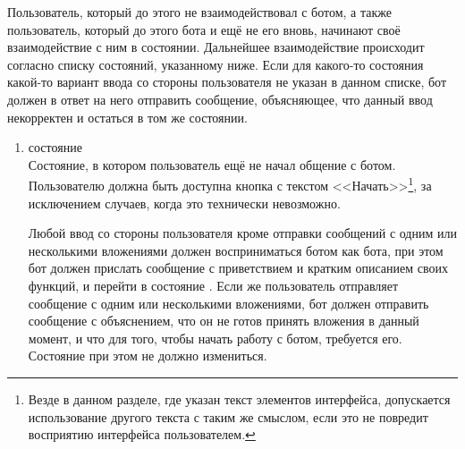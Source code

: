         Пользователь, который до этого не взаимодействовал с ботом, а также пользователь, который
        до этого  бота и ещё не  его вновь, начинают
        своё взаимодействие с ним в \hyperref[itm:req:ui:states:init]{} состоянии.
        Дальнейшее взаимодействие происходит согласно списку состояний, указанному ниже.
        Если для какого-то состояния какой-то вариант ввода со стороны пользователя не указан в данном
        списке, бот должен в ответ на него отправить сообщение, объясняющее, что данный
        ввод некорректен и остаться в том же состоянии.
        \begin{enumerate}
            \item \label{itm:req:ui:states:init}
                 состояние \\
                Состояние, в котором пользователь ещё не начал общение с ботом.
                Пользователю должна быть доступна кнопка с текстом <<Начать>>\footnote{
                Везде в данном разделе, где указан текст элементов интерфейса, допускается
                использование другого текста с таким же смыслом, если это не повредит восприятию
                интерфейса пользователем.}, за исключением случаев, когда это технически невозможно.

                Любой ввод со стороны пользователя кроме отправки сообщений с одним или несколькими
                вложениями должен восприниматься ботом как  бота, при этом бот должен прислать
                сообщение с приветствием и кратким описанием своих функций, и перейти в состояние
                \hyperref[itm:req:ui:states:mainmenu]{}.
                Если же пользователь отправляет сообщение с одним или несколькими
                вложениями, бот должен отправить сообщение с объяснением, что он не готов принять вложения
                в данный момент, и что для того, чтобы начать работу с ботом, требуется 
                его. Состояние при этом не должно измениться.


\end{enumerate}
